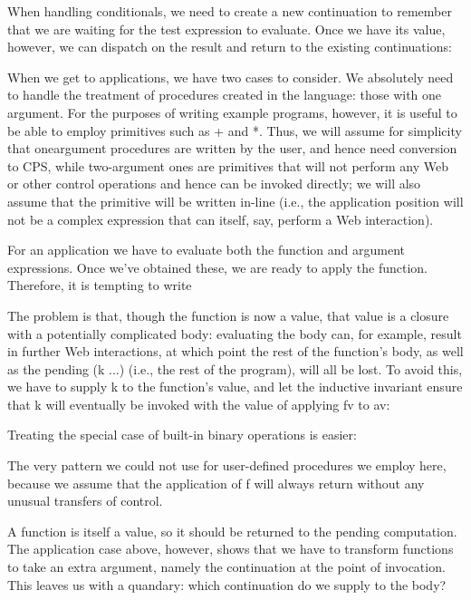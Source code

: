 When handling conditionals, we need to create a new continuation to remember
that we are waiting for the test expression to evaluate. Once we have its value,
however, we can dispatch on the result and return to the existing continuations:

When we get to applications, we have two cases to consider. We absolutely need
to handle the treatment of procedures created in the language: those with one
argument. For the purposes of writing example programs, however, it is useful to
be able to employ primitives such as + and *. Thus, we will assume for
simplicity that oneargument procedures are written by the user, and hence need
conversion to CPS, while two-argument ones are primitives that will not perform
any Web or other control operations and hence can be invoked directly; we will
also assume that the primitive will be written in-line (i.e., the application
position will not be a complex expression that can itself, say, perform a Web
interaction).

For an application we have to evaluate both the function and argument
expressions. Once we’ve obtained these, we are ready to apply the function.
Therefore, it is tempting to write


The problem is that, though the function is now a value, that value is a closure
with a potentially complicated body: evaluating the body can, for example,
result in further Web interactions, at which point the rest of the function’s
body, as well as the pending (k ...) (i.e., the rest of the program), will all
be lost. To avoid this, we have to supply k to the function’s value, and let the
inductive invariant ensure that k will eventually be invoked with the value of
applying fv to av:

Treating the special case of built-in binary operations is easier:

The very pattern we could not use for user-defined procedures we employ here,
because we assume that the application of f will always return without any
unusual transfers of control.

A function is itself a value, so it should be returned to the pending
computation. The application case above, however, shows that we have to
transform functions to take an extra argument, namely the continuation at the
point of invocation. This leaves us with a quandary: which continuation do we
supply to the body?

